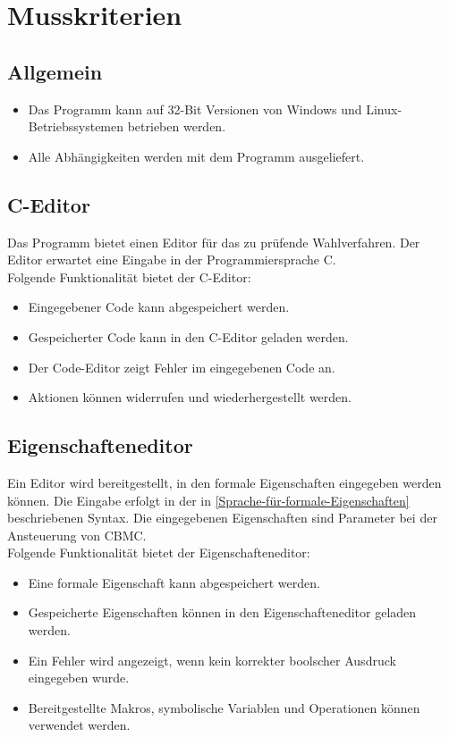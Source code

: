 \documentclass[a4paper]{scrreprt}
\begin{document}
\section{Musskriterien}
\subsection{Allgemein}
\begin{itemize}
\item Das Programm kann auf 32-Bit Versionen von Windows und Linux-Betriebssystemen betrieben werden.
\item Alle Abhängigkeiten werden mit dem Programm ausgeliefert.
\end{itemize}

\subsection{C-Editor}
Das Programm bietet einen Editor für das zu prüfende Wahlverfahren. Der Editor erwartet eine Eingabe in der Programmiersprache C.\\
Folgende Funktionalität bietet der C-Editor:
\begin{itemize}
	\item Eingegebener Code kann abgespeichert werden.
	\item Gespeicherter Code kann in den C-Editor geladen werden.
	\item Der Code-Editor zeigt Fehler im eingegebenen Code an.
	\item Aktionen können widerrufen und wiederhergestellt werden.
\end{itemize}
	
\subsection{Eigenschafteneditor}
Ein Editor wird bereitgestellt, in den formale Eigenschaften eingegeben werden können. Die Eingabe erfolgt in der in \ref{Sprache-für-formale-Eigenschaften} beschriebenen Syntax. Die eingegebenen Eigenschaften sind Parameter bei der Ansteuerung von \ac{CBMC}.\\
Folgende Funktionalität bietet der Eigenschafteneditor:
\begin{itemize}
	\item Eine formale Eigenschaft kann abgespeichert werden.
	\item Gespeicherte Eigenschaften können in den Eigenschafteneditor geladen werden.
	\item Ein Fehler wird angezeigt, wenn kein korrekter boolscher Ausdruck eingegeben wurde.
	\item Bereitgestellte Makros, symbolische Variablen und Operationen können verwendet werden.
\end{itemize}
\end{document}
